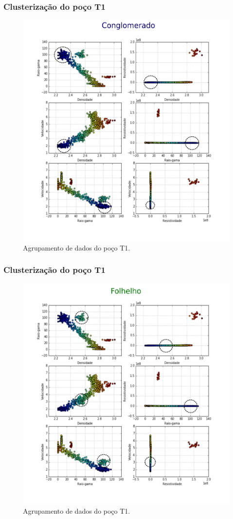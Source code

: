 \documentclass[10pt]{beamer} %
\begin{document}
\begin{frame}
	\frametitle{Clusterização do poço T1}
	\begin{figure}[H]
		\centering
		\includegraphics[scale=0.4]{Imagens/conglomerado.png}
		\caption{Agrupamento de dados do poço T1.}
	\end{figure} 
\end{frame}
\begin{frame}
	\frametitle{Clusterização do poço T1}
	\begin{figure}[H]
		\centering
		\includegraphics[scale=0.4]{Imagens/folhelho.png}
		\caption{Agrupamento de dados do poço T1.}
	\end{figure} 
\end{frame}
\end{document}
